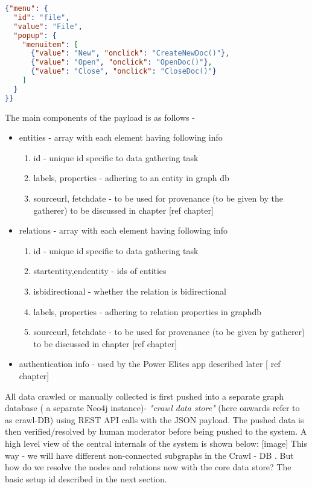 \begin{lstlisting}[language=json,firstnumber=1]
{"menu": {
  "id": "file",
  "value": "File",
  "popup": {
    "menuitem": [
      {"value": "New", "onclick": "CreateNewDoc()"},
      {"value": "Open", "onclick": "OpenDoc()"},
      {"value": "Close", "onclick": "CloseDoc()"}
    ]
  }
}}
\end{lstlisting}

The main components of the payload is as follows -
\begin{itemize}
    \item entities - array with each element having following info
        \begin{enumerate}
            \item id - unique id specific to data gathering task
            \item labels, properties - adhering to an entity in graph db
            \item sourceurl, fetchdate - to be used for provenance (to be given by the gatherer) to be discussed in chapter [ref chapter]
        \end{enumerate}
    \item relations - array with each element having following info
        \begin{enumerate}
            \item id - unique id specific to data gathering task
            \item startentity,endentity - ids of entities
            \item isbidirectional - whether the relation is bidirectional 
            \item labels, properties - adhering to relation properties in graphdb
            \item sourceurl, fetchdate - to be used for provenance (to be given by gatherer) to be discussed in chapter [ref chapter]
        \end{enumerate}
    \item authentication info - used by the Power Elites app described later [ ref chapter]
\end{itemize}

All data crawled or manually collected is first pushed into a separate graph database ( a separate Neo4j instance)-  \emph{ "crawl data store" } (here onwards refer to as crawl-DB) using REST API calls with the JSON payload. The pushed data is then verified/resolved by human moderator before being pushed to the system. A high level view of the central internals of the system is shown below:
[image]
This way - we will have different non-connected subgraphs in the Crawl - DB .  
But how do we resolve the nodes and relations now with the core data store? The basic setup id described in the next section. 

